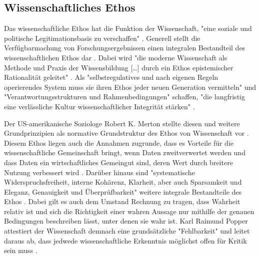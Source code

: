 \subsection{Wissenschaftliches Ethos}

Das wissenschaftliche Ethos hat die Funktion der Wissenschaft, "eine soziale und politische Legitimationsbasis zu verschaffen" \cite{descher_2012_ethos}. Generell stellt die Verfügbarmachung von Forschungsergebnissen einen integralen Bestandteil des wissenschaftlichen Ethos dar \cite{Fangerau_2014}. Dabei wird "die moderne Wissenschaft als Methode und Praxis der Wissensbildung […] durch ein Ethos epistemischer Rationalität geleitet" \cite{Oezmen_2015}. Als "selbstregulatives und nach eigenen Regeln operierendes System muss sie ihren Ethos jeder neuen Generation vermitteln" und "Verantwortungsstrukturen und Rahmenbedingungen" schaffen, "die langfristig eine verlässliche Kultur wissenschaftlicher Integrität stärken" \cite[:7]{wr_2015_wissenschaft_integritaet}.

Der US-amerikanische Soziologe Robert K. Merton stellte diesen und weitere Grundprinzipien als normative Grundstruktur des Ethos von Wissenschaft vor \cite{Merton_1985}. Diesem Ethos liegen auch die Annahmen zugrunde, dass es Vorteile für die wissenschaftliche Gemeinschaft bringt, wenn Daten zweitverwertet werden und dass Daten ein wirtschaftliches Gemeingut sind, deren Wert durch breitere Nutzung verbessert wird \cite{RIN_2010_open_research}. Darüber hinaus sind "systematische Widerspruchsfreiheit, interne Kohärenz, Klarheit, aber auch Sparsamkeit und Eleganz, Genauigkeit und Überprüfbarkeit" weitere integrale Bestandteile des Ethos \cite{Oezmen_2015}. Dabei gilt es auch dem Umstand Rechnung zu tragen, dass Wahrheit relativ ist und sich die Richtigkeit einer wahren Aussage nur mithilfe der genauen Bedingungen beschreiben lässt, unter denen sie wahr ist. Karl Raimund Popper attestiert der Wissenschaft demnach eine grundsätzliche "Fehlbarkeit" und leitet daraus ab, dass jedwede wissenschaftliche Erkenntnis möglichst offen für Kritik sein muss  \cite{popper_2005_logic}.

